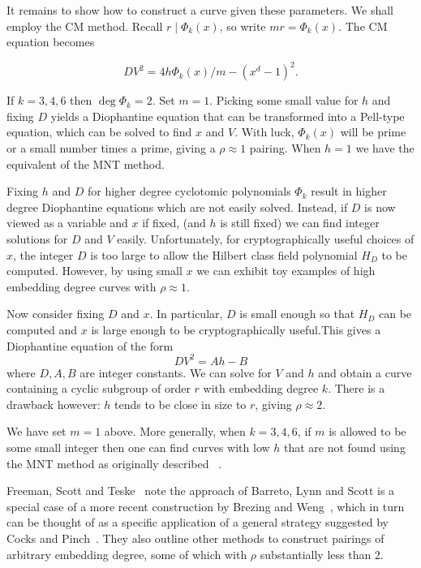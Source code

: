 It remains to show how to construct a curve given these parameters. We shall
employ the CM method.
Recall $r \mid \Phi_k(x)$, so write $m r = \Phi_k(x)$.
The CM equation becomes

\[ D V^2 = 4 h \Phi_k(x) / m -(x^d-1)^2 . \]

If $k=3,4,6$ then $\deg \Phi_k = 2$.
Set $m = 1$.
Picking some small value for $h$ and fixing $D$ yields
a Diophantine equation that can be transformed into a Pell-type equation,
which can be solved to find $x$ and $V$. With luck, $\Phi_k(x)$ will be
prime or a small number times a prime, giving a $\rho \approx 1$ pairing.
When $h=1$ we have the equivalent of the MNT method.

Fixing $h$ and $D$ for higher degree cyclotomic polynomials
$\Phi_k$ result in higher degree Diophantine equations which are not easily
solved.
Instead, if $D$ is now viewed as a variable and $x$ if fixed,
(and $h$ is still fixed) we can find integer solutions for $D$ and $V$
easily. Unfortunately, for cryptographically useful choices of $x$,
the integer $D$ is too large to allow the Hilbert class field polynomial $H_D$
to be computed.
However, by using small $x$ we can exhibit toy examples of high
embedding degree curves with $\rho \approx 1$.

Now consider fixing $D$ and $x$. In particular, $D$ is small enough so
that $H_D$ can be computed and $x$ is large enough to be cryptographically
useful.This gives a Diophantine
equation of the form
\[ D V^2 = Ah - B \]
where $D, A, B$ are integer constants. We can solve for $V$ and $h$ and
obtain a curve containing a cyclic subgroup of order $r$
with embedding degree $k$. There is a drawback however: $h$ tends to be close
in size to $r$, giving $\rho \approx 2$.

We have set $m = 1$ above. More generally,
when $k = 3,4,6$, if $m$ is allowed to be some small integer then one
can find curves with low $h$ that are not found using the MNT method as
originally described ~\cite{moremnt}.

Freeman, Scott and Teske~\cite{fst} note the approach of Barreto, Lynn and
Scott is a special case of a more recent construction by
Brezing and Weng~\cite{bw}, which in turn can be thought of as a specific
application of a general strategy suggested by Cocks and Pinch~\cite{cp}.
They also outline
other methods to construct pairings of arbitrary embedding degree,
some of which with $\rho$ substantially less than 2.

